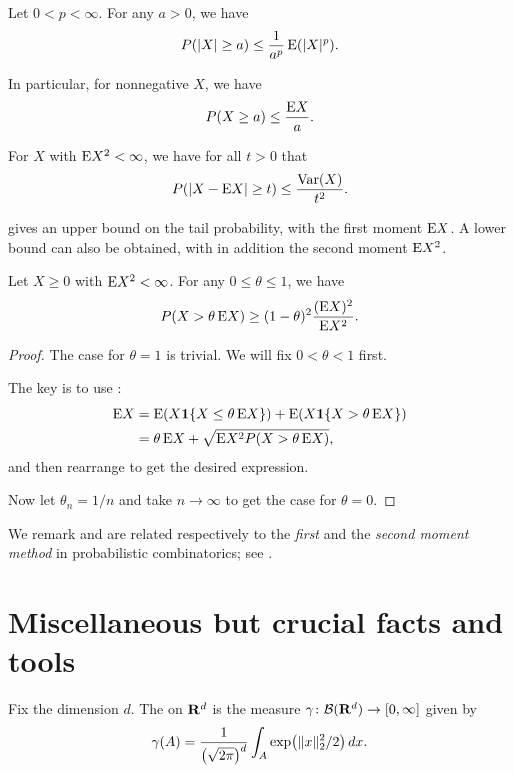 \begin{namedthm} \label{thm:Markov-ineq-prob}
    Let $0< p < \infty$. For any $a > 0$, we have \[
        P(\lvert X \rvert \geq a) \leq \frac{1}{a^p} \mathop{}\!\mathrm{E}(\lvert X \rvert^p).
    \]

    In particular, for nonnegative $X$, we have \[
        P(X \geq a) \leq \frac{\mathop{}\!\mathrm{E} X}{a}.
    \]
\end{namedthm}

\begin{namedthm} \label{thm:Chebyshev-ineq}
    For $X$ with $\mathop{}\!\mathrm{E} X^2 < \infty$, we have for all $t > 0$ that \[
        P(\lvert X - \mathop{}\!\mathrm{E} X \rvert \geq t) \leq \frac{\operatorname{Var}(X)}{t^2}.
    \]
\end{namedthm}

 gives an upper bound on the tail probability, with the first moment $\mathop{}\!\mathrm{E} X$. A lower bound can also be obtained, with in addition the second moment $\mathop{}\!\mathrm{E} X^2$.

\begin{namedthm} \label{thm:PZ-ineq}
    Let $X \geq 0$ with $\mathop{}\!\mathrm{E} X^2 < \infty$. For any $0\leq \theta\leq 1$, we have \[
        P(X > \theta \mathop{}\!\mathrm{E} X) \geq (1-\theta)^2 \frac{(\mathop{}\!\mathrm{E} X)^2}{\mathop{}\!\mathrm{E} X^2}.
    \]
\end{namedthm}
\begin{proof}
    The case for $\theta = 1$ is trivial. We will fix $0 < \theta < 1$ first.

    The key is to use : \begin{align*}
        \E X & = \E (X \ind\{X \leq \theta \E X\}) + \E(X \ind\{X > \theta \E X\}) \\
        & = \theta \E X + \sqrt{\E X^2 P(X > \theta \E X)},
    \end{align*} and then rearrange to get the desired expression.

    Now let $\theta_n = 1/n$ and take $n \to \infty$ to get the case for $\theta = 0$.
\end{proof}

We remark  and  are related respectively to the \emph{first} and the \emph{second moment method} in probabilistic combinatorics; see \cite[Chapter~2]{Roch_2024}.

\section{Miscellaneous but crucial facts and tools}
\begin{defn}
    Fix the dimension $d$. The  on $\mathbf{R}^d$ is the measure $\gamma\colon \mathcal{B}(\mathbf{R}^d) \to [0,\infty]$ given by \[
        \gamma(A) = \frac{1}{\bigl(\sqrt{2\pi}\bigr)^d} \int_A \exp\bigl(\lVert x \rVert^2_2/2\bigr)\,dx.
    \]
\end{defn}

